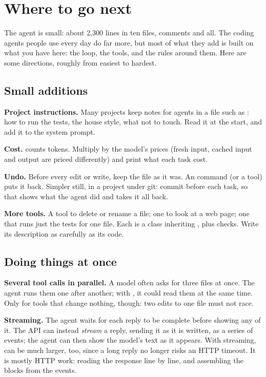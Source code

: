 \chapter{Where to go next}\label{ch:next}

The agent is small: about 2,300 lines in ten files, comments and all. The coding
agents people use every day do far more, but most of what they add is
built on what you have here: the loop, the tools, and the rules around
them. Here are some directions, roughly from easiest to hardest.

\section{Small additions}

\textbf{Project instructions.} Many projects keep notes for agents in a
file such as : how to run the tests, the house style,
what not to touch. Read it at the start, and add it to the system prompt.

\textbf{Cost.}  counts tokens. Multiply by the model's prices
(fresh input, cached input and output are priced differently) and print
what each task cost.

\textbf{Undo.} Before every edit or write, keep the file as it was. An
 command (or a tool) puts it back. Simpler still, in a
project under git: commit before each task, so that  shows
what the agent did and  takes it all back.

\textbf{More tools.} A tool to delete or rename a file; one to look at a
web page; one that runs just the tests for one file. Each is a class
inheriting , plus checks. Write its description as carefully
as its code.

\section{Doing things at once}

\textbf{Several tool calls in parallel.} A model often asks for three files
at once. The agent runs them one after another; with , it
could read them at the same time. Only for tools that change nothing,
though: two edits to one file must not race.

\textbf{Streaming.} The agent waits for each reply to be complete before
showing any of it. The API can instead \emph{stream} a reply, sending it as
it is written, as a series of events; the agent can then show the model's
text as it appears. With streaming,  can be much larger,
too, since a long reply no longer risks an HTTP timeout. It is mostly HTTP
work: reading the response line by line, and assembling the blocks from
the events.

